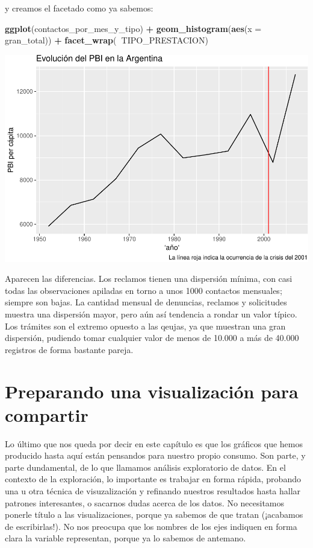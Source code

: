 \documentclass[]{book}
\newenvironment{Shaded}{\begin{snugshade}}{\end{snugshade}}
\newcommand{\KeywordTok}[1]{\textcolor[rgb]{0.13,0.29,0.53}{\textbf{#1}}}
\newcommand{\DataTypeTok}[1]{\textcolor[rgb]{0.13,0.29,0.53}{#1}}
\newcommand{\StringTok}[1]{\textcolor[rgb]{0.31,0.60,0.02}{#1}}
\newcommand{\OperatorTok}[1]{\textcolor[rgb]{0.81,0.36,0.00}{\textbf{#1}}}
\newcommand{\NormalTok}[1]{#1}
\begin{document}
y creamos el facetado como ya sabemos:

\begin{Shaded}
\begin{Highlighting}[]
\KeywordTok{ggplot}\NormalTok{(contactos_por_mes_y_tipo) }\OperatorTok{+}\StringTok{ }
\StringTok{    }\KeywordTok{geom_histogram}\NormalTok{(}\KeywordTok{aes}\NormalTok{(}\DataTypeTok{x =}\NormalTok{ gran_total)) }\OperatorTok{+}
\StringTok{    }\KeywordTok{facet_wrap}\NormalTok{(}\OperatorTok{~}\NormalTok{TIPO_PRESTACION)}
\end{Highlighting}
\end{Shaded}

\includegraphics{ciencia_de_datos_politicas_publicas_files/figure-latex/unnamed-chunk-103-1.pdf}

Aparecen las diferencias. Los reclamos tienen una dispersión mínima, con
casi todas las observaciones apiladas en torno a unos 1000 contactos
mensuales; siempre son bajas. La cantidad mensual de denuncias, reclamos
y solicitudes muestra una dispersión mayor, pero aún así tendencia a
rondar un valor típico. Los trámites son el extremo opuesto a las
qeujas, ya que muestran una gran dispersión, pudiendo tomar cualquier
valor de menos de 10.000 a más de 40.000 registros de forma bastante
pareja.

\section{Preparando una visualización para
compartir}\label{preparando-una-visualizacion-para-compartir}

Lo último que nos queda por decir en este capítulo es que los gráficos
que hemos producido hasta aquí están pensandos para nuestro propio
consumo. Son parte, y parte dundamental, de lo que llamamos análisis
exploratorio de datos. En el contexto de la exploración, lo importante
es trabajar en forma rápida, probando una u otra técnica de
visuzalización y refinando nuestros resultados hasta hallar patrones
interesantes, o sacarnos dudas acerca de los datos. No necesitamos
ponerle título a las visualizaciones, porque ya sabemos de que tratan
(¡acabamos de escribirlas!). No nos preocupa que los nombres de los ejes
indiquen en forma clara la variable representan, porque ya lo sabemos de
antemano.
\end{document}

